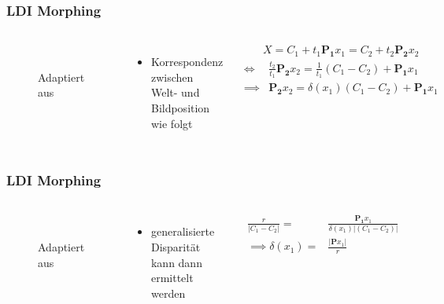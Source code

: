 \documentclass[aspectratio=169]{beamer}
\begin{document}
\begin{frame}
    \frametitle{LDI Morphing}
        \begin{columns}
            \begin{figure}
                \centering
                \resizebox{.9\linewidth}{!}{}
                \\[-1ex]{\tiny Adaptiert aus~\cite{mcmillan1997image}}%
                \label{fig:ldimorph}
        \end{figure}
        \begin{itemize}
            \item Korrespondenz zwischen Welt- und Bildposition wie folgt
        \end{itemize}
        \begin{align}
            X = C_1 + t_1 \mathbf{P_1} x_1 %
            = C_2 + t_2 \mathbf{P_2} x_2
        \end{align}
        \begin{align}
            \iff{} & \frac{t_2}{t_1} \mathbf{P_2} x_2 %
            = \frac{1}{t_1}(C_1 - C_2) + \mathbf{P_1} x_1 \\
            \implies{} & \mathbf{P_2} x_2 
	        = \delta(x_1) (C_1 - C_2) + \mathbf{P_1} x_1
        \end{align}
    \end{columns}
\end{frame}

\begin{frame}
    \frametitle{LDI Morphing}
        \begin{columns}
            \begin{figure}
                \centering
                \resizebox{.9\linewidth}{!}{}
                \\[-1ex]{\tiny Adaptiert aus~\cite{mcmillan1997image}}%
                \label{fig:ldimorph}
        \end{figure}
        \begin{itemize}
            \item generalisierte Disparität kann dann ermittelt werden
        \end{itemize}
        \begin{align}
            \frac{r}{\lvert C_1 - C_2 \rvert} = &
            \frac{\mathbf{P_1} x_1}{\delta(x_1) \lvert (C_1 - C_2) \rvert}
            \\ %
            \implies \delta(x_1) =              &
            \frac{\lvert \mathbf{P} x_1 \lvert}{r}
        \end{align}
    \end{columns}
\end{frame}
\end{document}
